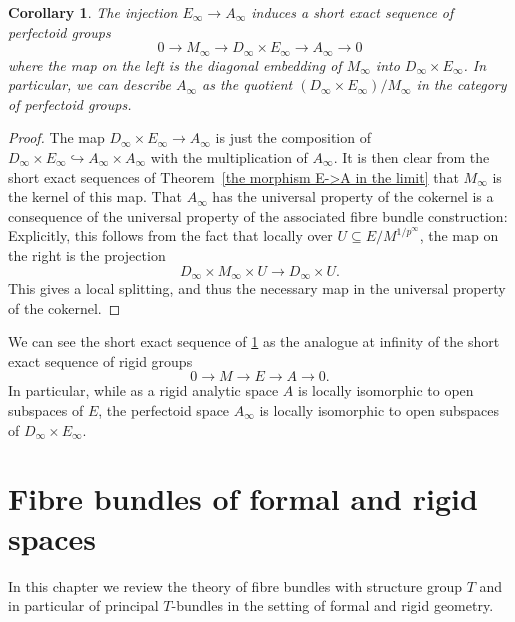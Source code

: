 \documentclass[10pt,oneside]{amsart}
\newtheorem{corollary}[theorem]{Corollary}
\theoremstyle{definition}
\begin{document}
	\begin{corollary}\label{A_infty as a quotient of D_infty times E_infty}
		The injection $E_\infty \rightarrow A_\infty$ induces a short exact sequence of perfectoid groups
		\[0\rightarrow M_\infty\rightarrow D_\infty \times E_\infty \rightarrow A_\infty\rightarrow 0\]
		where the map on the left is the diagonal embedding of $M_\infty$ into $D_\infty\times E_\infty$. In particular, we can describe $A_\infty$ as the quotient $(D_\infty\times E_\infty)/M_\infty$ in the category of perfectoid groups.
	\end{corollary}
	\begin{proof}
		The map $D_\infty\times E_\infty \rightarrow A_\infty$ is just the composition of $D_\infty\times E_\infty \hookrightarrow A_\infty\times A_\infty$ with the multiplication of $A_\infty$. It is then clear from the short exact sequences of Theorem~\ref{the morphism E->A in the limit} that $M_\infty$ is the kernel of this map. That $A_\infty$ has the universal property of the cokernel is a consequence of the universal property of the associated fibre bundle construction: Explicitly, this follows from the fact that locally over $U\subseteq E/M^{1/p^\infty}$, the map on the right is the projection
		\[D_\infty \times M_\infty \times U \rightarrow D_\infty\times U.\]
		This gives a local splitting, and thus the necessary map in the universal property of the cokernel.
	\end{proof}
	We can see the short exact sequence of \ref{A_infty as a quotient of D_infty times E_infty} as the analogue at infinity of the short exact sequence 	of rigid groups
		\[0\rightarrow M\rightarrow E\rightarrow A\rightarrow 0.\]
	In particular, while as a rigid analytic space $A$ is locally isomorphic to open subspaces of $E$, the perfectoid space $A_\infty$ is locally isomorphic to open subspaces of $D_\infty \times E_\infty$.
	
	\appendix
	\section{Fibre bundles of formal and rigid spaces}
	In this chapter we review the theory of fibre bundles with structure group $T$ and in particular of principal $T$-bundles in the setting of formal and rigid geometry.
		
	
	
\end{document}
